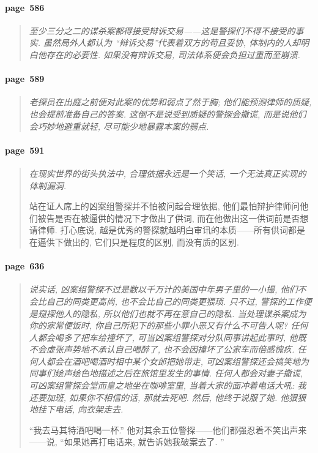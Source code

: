 \paragraph*{page~586}
\begin{quotation}
    \itshape
    至少三分之二的谋杀案都得接受辩诉交易------这是警探们不得不接受的事实. 虽然局外人都认为 ``辩诉交易''代表着双方的苟且妥协, 体制内的人却明白他存在的必要性. 如果没有辩诉交易, 司法体系便会负担过重而至崩溃.
\end{quotation}

\paragraph*{page~589}
\begin{quotation}
    \itshape
    老探员在出庭之前便对此案的优势和弱点了然于胸; 他们能预测律师的质疑, 也会提前准备自己的答案. 这倒不是说受到质疑的警探会撒谎, 而是说他们会巧妙地避重就轻, 尽可能少地暴露本案的弱点. 
\end{quotation}

\paragraph*{page~591}
\begin{quotation}
    \itshape
    在现实世界的街头执法中, 合理依据永远是一个笑话, 一个无法真正实现的体制漏洞. 

    站在证人席上的凶案组警探并不怕被问起合理依据, 他们最怕辩护律师问他们被告是否在被逼供的情况下才做出了供词, 而在他做出这一供词前是否想请律师. 打心底说, 越是优秀的警探就越明白审讯的本质------所有供词都是在逼供下做出的, 它们只是程度的区别, 而没有质的区别. 
\end{quotation}

\paragraph*{page~636}
\begin{quotation}
    \itshape
    说实话, 凶案组警探不过是数以千万计的美国中年男子里的一小撮, 他们不会比自己的同类更高尚, 也不会比自己的同类更猥琐. 只不过, 警探的工作便是窥探他人的隐私, 所以他们也就不再在意自己的隐私. 当处理谋杀案成为你的家常便饭时, 你自己所犯下的那些小罪小恶又有什么不可告人呢? 任何人都会喝多了把车给撞坏了, 可当凶案组警探对分队同事讲起此事时, 他既不会虚张声势地不承认自己喝醉了, 也不会因撞坏了公家车而倍感愧疚. 任何人都会在酒吧喝酒时相中某个女郎把她带走, 可凶案组警探还会搞笑地为同事们绘声绘色地描述之后在旅馆里发生的事情. 任何人都会对妻子撒谎, 可凶案组警探会堂而皇之地坐在咖啡室里, 当着大家的面冲着电话大吼: 我还要加班, 如果你不相信的话, 那就去死吧. 然后, 他终于说服了她. 他狠狠地挂下电话, 向衣架走去.

    ``我去马其特酒吧喝一杯.'' 他对其余五位警探------他们都强忍着不笑出声来------说, ``如果她再打电话来, 就告诉她我破案去了. ''
\end{quotation}


